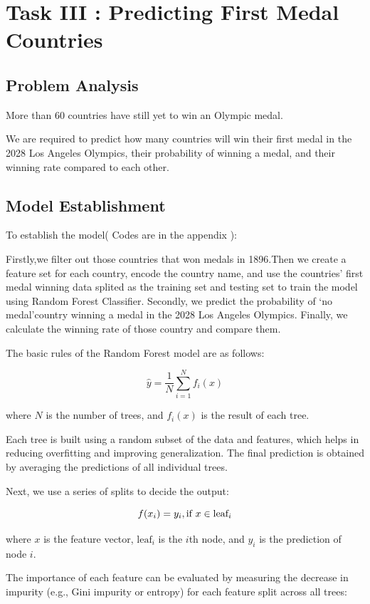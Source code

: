 \section{Task III : Predicting First Medal Countries}
\subsection{Problem Analysis}

More than 60 countries have still yet to win an Olympic medal.

We are required to predict how many countries will win their first medal in the 2028 Los Angeles Olympics, their probability of winning a medal, and their winning rate compared to each other.
\subsection{Model Establishment}

To establish the model( Codes are in the appendix ):

Firstly,we filter out those countries that won medals in 1896.Then we create a feature set for each country, encode the country name, and use the countries' first medal winning data splited as the training set and testing set to train the model using Random Forest Classifier.
Secondly, we predict the probability of `no medal'country winning a medal in the 2028 Los Angeles Olympics.
Finally, we calculate the winning rate of those country and compare them.

The basic rules of the Random Forest model are as follows:

$$\hat{y} = \frac{1}{N} \sum_{i=1}^{N} f_i(x)$$

where $N$ is the number of trees, and $f_i(x)$ is the result of each tree.

Each tree is built using a random subset of the data and features, which helps in reducing overfitting and improving generalization. The final prediction is obtained by averaging the predictions of all individual trees.

Next, we use a series of splits to decide the output:

$$f(x_i) =  
    y_i, \text{if } x \in \text{leaf}_i \\ 
$$

where $x$ is the feature vector, $\text{leaf}_i$ is the $i$th node, and $y_i$ is the prediction of node $i$.

The importance of each feature can be evaluated by measuring the decrease in impurity (e.g., Gini impurity or entropy) for each feature split across all trees:

